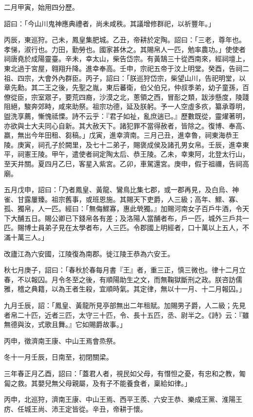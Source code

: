 \begin{pinyinscope}
二月甲寅，始用四分歷。

詔曰：「今山川鬼神應典禮者，尚未咸秩。其議增修群祀，以祈豐年。」

丙辰，東巡狩。己未，鳳皇集肥城。乙丑，帝耕於定陶。詔曰：「三老，尊年也。孝悌，淑行也。力田，勤勞也。國家甚休之。其賜帛人一匹，勉率農功。」使使者祠唐堯於成陽靈臺。辛未，幸太山，柴告岱宗。有黃鵠三十從西南來，經祠壇上，東北過于宮屋，翱翔升降。進幸奉高。壬申，宗祀五帝于汶上明堂。癸酉，告祠二祖、四宗，大會外內群臣。丙子，詔曰：「朕巡狩岱宗，柴望山川，告祀明堂，以章先勳。其二王之後，先聖之胤，東后蕃衛，伯父伯兄，仲叔季弟，幼子童孫，百僚從臣，宗室眾子，要荒四裔，沙漠之北，蔥領之西，冒耏之類，跋涉懸度，陵踐阻絕，駿奔郊畤，咸來助祭。祖宗功德，延及朕躬。予一人空虛多疚，纂承尊明，盥洗享薦，慚愧祗慄。詩不云乎：『君子如祉，亂庶遄已。』歷數既從，靈燿著明，亦欲與士大夫同心自新。其大赦天下。諸犯罪不當得赦者，皆除之。復博、奉高、嬴，無出今年田租、芻稿。」戊寅，進幸濟南。三月己丑，進幸魯，祠東海恭王陵。庚寅，祠孔子於闕里，及七十二弟子，賜褒成侯及諸孔男女帛。壬辰，進幸東平，祠憲王陵。甲午，遣使者祠定陶太后、恭王陵。乙未，幸東阿，北登太行山，至天井關。夏四月乙巳，客星入紫宮。乙卯，車駕還宮。庚申，假于祖禰，告祠高廟。

五月戊申，詔曰：「乃者鳳皇、黃龍、鸞鳥比集七郡，或一郡再見，及白烏、神雀、甘露屢臻。祖宗舊事，或班恩施。其賜天下吏爵，人三級；高年、鰥、寡、孤、獨帛，人一匹。經曰：「無侮鰥寡，惠此煢獨。』加賜河南女子百戶牛酒，令天下大酺五日。賜公卿已下錢帛各有差；及洛陽人當酺者布，戶一匹，城外三戶共一匹。賜博士員弟子見在太學者布，人三匹。令郡國上明經者，口十萬以上五人，不滿十萬三人。」

改廬江為六安國，江陵復為南郡。徙江陵王恭為六安王。

秋七月庚子，詔曰：「春秋於春每月書『王』者，重三正，慎三微也。律十二月立春，不以報囚。月令冬至之後，有順陽助生之文，而無鞠獄斷刑之政。朕咨訪儒雅，稽之典籍，以為王者生殺，宜順時氣。其定律，無以十一月、十二月報囚。」

九月壬辰，詔：「鳳皇、黃龍所見亭部無出二年租賦。加賜男子爵，人二級；先見者帛二十匹，近者三匹，太守三十匹，令、長十五匹，丞、尉半之。《詩》云：『雖無德與汝，式歌且舞。』它如賜爵故事。」

丙申，徵濟南王康、中山王焉會烝祭。

冬十一月壬辰，日南至，初閉關梁。

三年春正月乙酉，詔曰：「蓋君人者，視民如父母，有憯怛之憂，有忠和之教，匍匐之救。其嬰兒無父母親屬，及有子不能養食者，稟給如律。」

丙申，北巡狩，濟南王康、中山王焉、西平王羨、六安王恭、樂成王黨、淮陽王疠、任城王尚、沛王定皆從。辛丑，帝耕于懷。


\end{pinyinscope}
